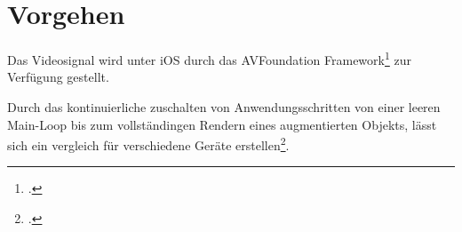 \section{Vorgehen} %
\label{sec:vorgehen}
\begin{comment}
	Vorgehen: Analysemethoden vorstellen wie Algorithmen untersucht werden.
	Vergleich O-Notation
	Laufzeitanalyse
	Gleiche Kriterien (selbes Bild, selbes Video)
\end{comment}


Das Videosignal wird unter iOS durch das AVFoundation Framework\footcite{avfoundation} zur Verfügung gestellt.

Durch das kontinuierliche zuschalten von Anwendungsschritten von einer leeren Main-Loop bis zum vollständingen Rendern eines augmentierten Objekts, lässt sich ein vergleich für verschiedene Geräte erstellen\footcite[Vgl.][]{wagner09b}.

